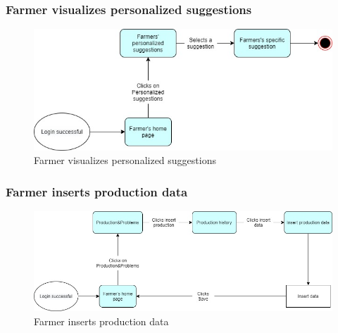 \documentclass{article}
\begin{document}
        
        
        \subsubsection{Farmer visualizes personalized suggestions}
            \begin{figure} [h]
                \centering
                \includegraphics[width=1\textwidth]{images/UserInterfaces/MapsFunctionalities/3. FarmerVisualizePersonalizedSuggestions.jpg}
                \caption{\label{fig:FarmerPersonalizedSuggestions}Farmer visualizes personalized suggestions}
            \end{figure}
    
        \newpage

        
        \subsubsection{Farmer inserts production data}
            \begin{figure} [h]
                \centering
                \includegraphics[width=1\textwidth]{images/UserInterfaces/MapsFunctionalities/4. FarmerInsertProductionData.jpg}
                \caption{\label{fig:FarmerProductionData}Farmer inserts production data}
            \end{figure}
    
        
\end{document}
